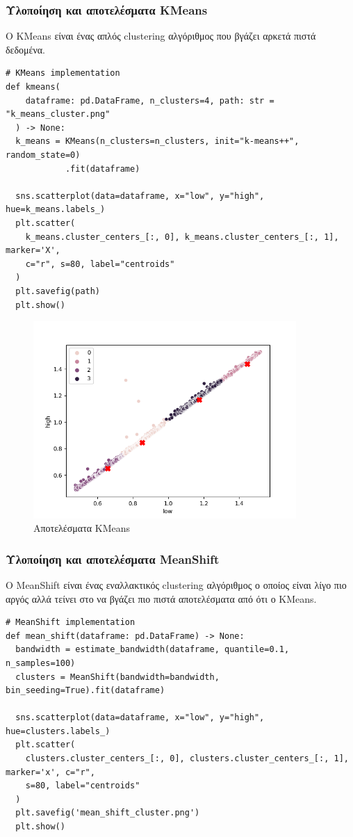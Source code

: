 \subsubsection{Υλοποίηση και αποτελέσματα KMeans}

Ο KMeans είναι ένας απλός clustering αλγόριθμος που βγάζει αρκετά πιστά δεδομένα.

\begin{verbatim}
# KMeans implementation
def kmeans(
    dataframe: pd.DataFrame, n_clusters=4, path: str = "k_means_cluster.png"
  ) -> None:
  k_means = KMeans(n_clusters=n_clusters, init="k-means++", random_state=0)
            .fit(dataframe)

  sns.scatterplot(data=dataframe, x="low", y="high", hue=k_means.labels_)
  plt.scatter(
    k_means.cluster_centers_[:, 0], k_means.cluster_centers_[:, 1], marker='X',
    c="r", s=80, label="centroids"
  )
  plt.savefig(path)
  plt.show()
\end{verbatim}

\begin{figure}[H]
  \centering
  \includegraphics[width=100mm]{Figures/k_means_cluster.png}
  \caption{Αποτελέσματα KMeans}
  \label{fig:k_means}
\end{figure}

\subsubsection{Υλοποίηση και αποτελέσματα MeanShift}

Ο MeanShift είναι ένας εναλλακτικός clustering αλγόριθμος ο οποίος είναι λίγο πιο αργός αλλά τείνει στο να βγάζει πιο πιστά αποτελέσματα από ότι ο KMeans.

\begin{verbatim}
# MeanShift implementation
def mean_shift(dataframe: pd.DataFrame) -> None:
  bandwidth = estimate_bandwidth(dataframe, quantile=0.1, n_samples=100)
  clusters = MeanShift(bandwidth=bandwidth, bin_seeding=True).fit(dataframe)

  sns.scatterplot(data=dataframe, x="low", y="high", hue=clusters.labels_)
  plt.scatter(
    clusters.cluster_centers_[:, 0], clusters.cluster_centers_[:, 1], marker='x', c="r",
    s=80, label="centroids"
  )
  plt.savefig('mean_shift_cluster.png')
  plt.show()
\end{verbatim}

